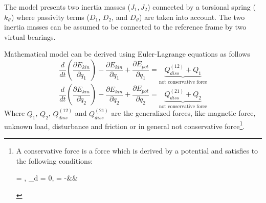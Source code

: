 \documentclass[12pt,a4paper]{scrartcl}
\begin{document}
\begin{onehalfspace}
The model presents two inertia masses ($J_1, J_2$) connected by a torsional spring ($k_{\vartheta}$) where passivity terms ($D_1$, $D_2$, and $D_{\vartheta}$) are taken into account. The two inertia masses can be assumed to be connected to the reference frame by two virtual bearings.

Mathematical model can be derived using Euler-Lagrange equations as follows
\begin{equation}\label{elagrange_1}
	\frac{d}{dt}\left(\frac{\partial E_{kin}}{\partial \dot{q}_1} \right) - 
	\frac{\partial E_{kin}}{\partial q_1} + \frac{\partial E_{pot}}{\partial 
		q_1} =\underbrace{Q_{diss}^{(12)} + Q_1}_\text{not conservative force}
\end{equation}
\begin{equation}\label{elagrange_2}
	\frac{d}{dt}\left(\frac{\partial E_{kin}}{\partial \dot{q}_2} \right) - 
	\frac{\partial E_{kin}}{\partial q_2} + \frac{\partial E_{pot}}{\partial 
		q_2} = \underbrace{Q_{diss}^{(21)} + Q_2}_\text{not conservative force}
\end{equation}
Where $Q_1$, $Q_2$, $Q_{diss}^{(12)}$ and $Q_{diss}^{(21)}$ are the generalized 
forces, like magnetic force, unknown load, disturbance and  friction or in general not conservative force\footnote{A conservative force is a force which is derived by a potential and satisfies to the following conditions:
	\begin{flalign*}
		\vec{\nabla}\times{} = ,\quad 
		\oint_{}\cdot d = 0,\quad
		 = -\vec{\nabla}\phi &&
	\end{flalign*}
}. 


\end{onehalfspace}
\end{document}
